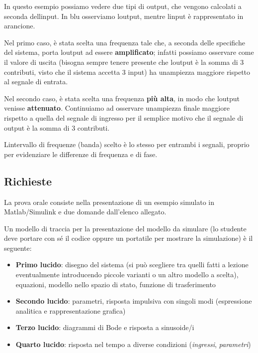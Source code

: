\documentclass[
]{article}
\begin{document}
In questo esempio possiamo vedere due tipi di output, che vengono
calcolati a seconda dell\textquotesingle input. In blu osserviamo
l\textquotesingle output, mentre l\textquotesingle input è rappresentato
in arancione.

Nel primo caso, è stata scelta una frequenza tale che, a seconda delle
specifiche del sistema, porta l\textquotesingle output ad essere
\textbf{amplificato}; infatti possiamo osservare come il valore di
uscita (bisogna sempre tenere presente che l\textquotesingle output è la
somma di 3 contributi, visto che il sistema accetta 3 input) ha
un\textquotesingle ampiezza maggiore rispetto al segnale di entrata.

Nel secondo caso, è stata scelta una frequenza \textbf{più alta}, in
modo che l\textquotesingle output venisse \textbf{attenuato}.
Continuiamo ad osservare un\textquotesingle ampiezza finale maggiore
rispetto a quella del segnale di ingresso per il semplice motivo che il
segnale di output è la somma di 3 contributi.

L\textquotesingle intervallo di frequenze (banda) scelto è lo stesso per
entrambi i segnali, proprio per evidenziare le differenze di frequenza e
di fase.

\vspace*{\fill}


\hypertarget{richieste}{%
\subsection{Richieste}\label{richieste}}

La prova orale consiste nella presentazione di un esempio simulato in
Matlab/Simulink e due domande dall'elenco allegato.

Un modello di traccia per la presentazione del modello da simulare (lo
studente deve portare con sé il codice oppure un portatile per mostrare
la simulazione) è il seguente:

\begin{itemize}
\item
  \textbf{Primo lucido}: disegno del sistema (si può scegliere tra
  quelli fatti a lezione eventualmente introducendo piccole varianti o
  un altro modello a scelta), equazioni, modello nello spazio di stato,
  funzione di trasferimento
\item
  \textbf{Secondo lucido}: parametri, risposta impulsiva con singoli
  modi (espressione analitica e rappresentazione grafica)
\item
  \textbf{Terzo lucido}: diagrammi di Bode e risposta a sinusoide/i
\item
  \textbf{Quarto lucido}: risposta nel tempo a diverse condizioni
  (\emph{ingressi}, \emph{parametri})
\end{itemize}
\end{document}
